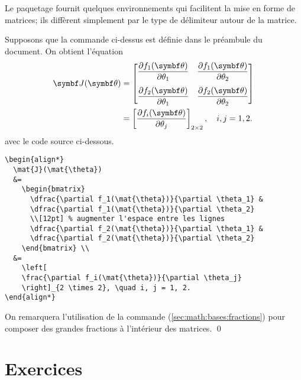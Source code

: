 \begin{exemple}
  \label{ex:math:matrices}
  Le paquetage  fournit quelques environnements qui
  facilitent la mise en forme de matrices; ils diffèrent simplement
  par le type de délimiteur autour de la matrice.

  Supposons que la commande \cmdprint{\mat} ci-dessus est définie dans
  le préambule du document. On obtient l'équation
  \begin{align*}
    \mat{J}(\mat{\theta})
    &=
      \begin{bmatrix}
        \dfrac{\partial f_1(\mat{\theta})}{\partial \theta_1} &
        \dfrac{\partial f_1(\mat{\theta})}{\partial \theta_2} \\[12pt]
        \dfrac{\partial f_2(\mat{\theta})}{\partial \theta_1} &
        \dfrac{\partial f_2(\mat{\theta})}{\partial \theta_2}
      \end{bmatrix} \\
    &=
      \left[
      \frac{\partial f_i(\mat{\theta})}{\partial \theta_j}
      \right]_{2 \times 2}, \quad i, j = 1, 2.
  \end{align*}
  avec le code source ci-dessous.
\begin{lstlisting}
\begin{align*}
  \mat{J}(\mat{\theta})
  &=
    \begin{bmatrix}
      \dfrac{\partial f_1(\mat{\theta})}{\partial \theta_1} &
      \dfrac{\partial f_1(\mat{\theta})}{\partial \theta_2}
      \\[12pt] % augmenter l'espace entre les lignes
      \dfrac{\partial f_2(\mat{\theta})}{\partial \theta_1} &
      \dfrac{\partial f_2(\mat{\theta})}{\partial \theta_2}
    \end{bmatrix} \\
  &=
    \left[
    \frac{\partial f_i(\mat{\theta})}{\partial \theta_j}
    \right]_{2 \times 2}, \quad i, j = 1, 2.
\end{align*}
\end{lstlisting}
  On remarquera l'utilisation de la commande \cmd{\dfrac}
  (\autoref{sec:math:bases:fractions}) pour composer des grandes
  fractions à l'intérieur des matrices. %
  \qed
\end{exemple}




\section{Exercices}
\label{sec:math:exercices}

